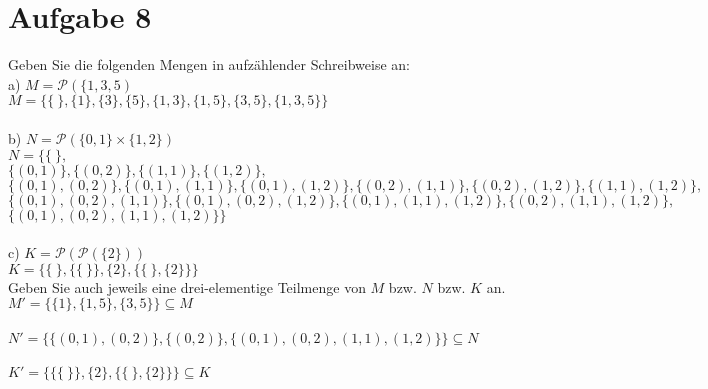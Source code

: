 \section*{Aufgabe 8}

Geben Sie die folgenden Mengen in aufzählender Schreibweise an:\\

a) $M = \mathcal{P}(\{1,3,5)$\\

$M = \{ \{ \ \}, \{1\}, \{3\}, \{5\}, \{1,3\}, \{1,5\}, \{3,5\}, \{1,3,5\}\}$\\~\\

b) $N = \mathcal{P}(\{0,1\} \times \{1,2\})$\\

$N = \{ \{ \ \},$\\
\hspace*{2.8em}$\{(0,1)\}, \{(0,2)\}, \{(1,1)\}, \{(1,2)\},$\\
\hspace*{2.8em}$\{(0,1),(0,2)\}, \{(0,1),(1,1)\}, \{(0,1),(1,2)\}, \{(0,2),(1,1)\}, \{(0,2),(1,2)\}, \{(1,1),(1,2)\},$\\
\hspace*{2.8em}$\{(0,1),(0,2),(1,1)\}, \{(0,1),(0,2),(1,2)\}, \{(0,1),(1,1),(1,2)\}, \{(0,2),(1,1),(1,2)\},$\\
\hspace*{2.8em}$\{(0,1),(0,2),(1,1),(1,2)\}\}$\\~\\

c) $K = \mathcal{P}(\mathcal{P}(\{2\}))$\\

$K = \{\{ \ \}, \{ \{ \ \} \}, \{2\}, \{\{ \ \}, \{2\}\}\}$\\

Geben Sie auch jeweils eine drei-elementige Teilmenge von $M$ bzw. $N$ bzw. $K$ an.\\

$M' = \{ \{1\}, \{1,5\}, \{3,5\} \} \subseteq M$\\~\\

$N' = \{ \{(0,1),(0,2)\}, \{(0,2)\}, \{(0,1),(0,2),(1,1),(1,2)\} \} \subseteq N$\\~\\

$K' = \{ \{ \{ \ \} \}, \{2\}, \{\{ \ \}, \{2\}\} \} \subseteq K$

\newpage

